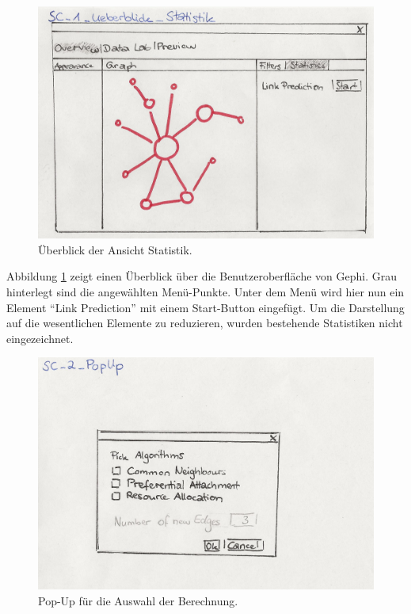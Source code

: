 \begin{figure}
    \includegraphics[width=\linewidth]{resources/SC-1.png}
    \caption{Überblick der Ansicht Statistik.}
    \label{fig:screen1}
\end{figure}

Abbildung \ref{fig:screen1} zeigt einen Überblick über die Benutzeroberfläche von Gephi. Grau hinterlegt sind die
angewählten Menü-Punkte. Unter dem Menü  wird hier nun ein Element ``Link Prediction'' mit einem
Start-Button eingefügt. Um die Darstellung auf die wesentlichen Elemente zu reduzieren, wurden bestehende Statistiken
nicht eingezeichnet.

\begin{figure}
    \includegraphics[width=\linewidth]{resources/SC-2.png}
    \caption{Pop-Up für die Auswahl der Berechnung.}
    \label{fig:screen2}
\end{figure}

